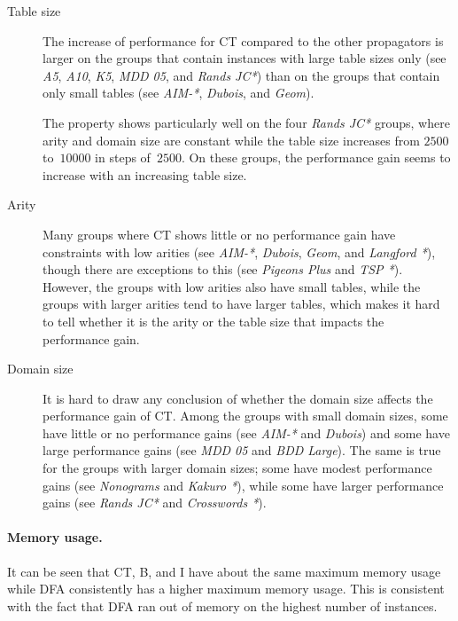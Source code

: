 \documentclass[a4paper,11pt]{article}
\theoremstyle{definition}
\numberwithin{equation}{section}
\begin{document}
\begin{description}
  \item[Table size] The increase
    of performance for CT compared to the other propagators
    is larger on the groups that contain
    instances with large table sizes only (see \emph{A5}, \emph{A10},
    \emph{K5}, \emph{MDD 05}, and \emph{Rands JC*}) than on the groups
    that contain only small tables (see \emph{AIM-*}, \emph{Dubois}, and \emph{Geom}).

    The property shows particularly well on the four \emph{Rands JC*} groups, where
    arity and domain size are constant while the table size increases from
    $2500$ to~$10000$ in steps of~$2500$. On these groups, the performance gain
    seems to increase with an increasing table size.

    \item[Arity] Many groups where CT shows little or no performance gain have
      constraints with low arities (see \emph{AIM-*}, \emph{Dubois}, \emph{Geom},
      and \emph{Langford *}), though there are exceptions to this (see \emph{Pigeons Plus}
      and \emph{TSP *}).
      However, the groups with low arities also have small tables, while the groups
      with larger arities tend to have larger tables, which makes it hard to
      tell whether it is the arity or the table size that impacts the performance gain.

    \item[Domain size] It is hard to draw any conclusion of whether the domain size affects
      the performance gain of CT. Among the groups with small domain sizes, some
      have little or no performance gains (see \emph{AIM-*} and \emph{Dubois}) and
      some have large performance gains (see \emph{MDD 05} and \emph{BDD Large}).
      The same is true for the groups with larger domain sizes; some have
      modest performance gains (see \emph{Nonograms} and \emph{Kakuro *}),
      while some have larger performance gains (see \emph{Rands JC*}
      and \emph{Crosswords *}).
\end{description}

\paragraph{Memory usage.}
It can be seen that CT, B, and I have about the same maximum memory usage
while DFA consistently has a higher maximum memory usage. This is consistent with
the fact that DFA ran out of memory on the highest number of instances.
\end{document}
